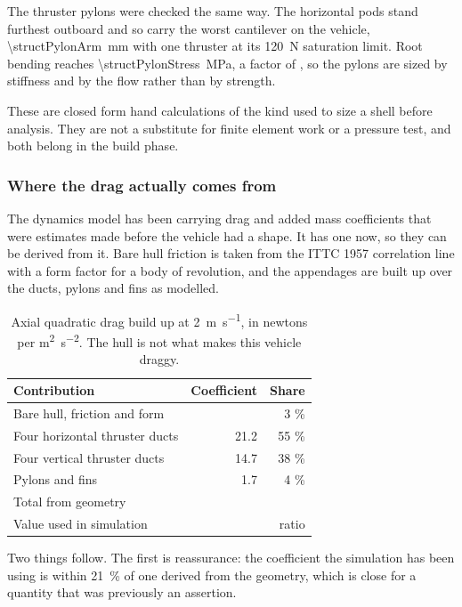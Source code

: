 \documentclass[10pt,a4paper]{article}
\begin{document}
The thruster pylons were checked the same way. The horizontal pods stand
furthest outboard and so carry the worst cantilever on the vehicle,
\SI{\structPylonArm}{\milli\metre} with one thruster at its
\SI{120}{\newton} saturation limit. Root bending reaches
\SI{\structPylonStress}{\mega\pascal}, a factor of \structPylonSf{}, so the
pylons are sized by stiffness and by the flow rather than by strength.

These are closed form hand calculations of the kind used to size a shell before
analysis. They are not a substitute for finite element work or a pressure test,
and both belong in the build phase.

\subsubsection{Where the drag actually comes from}\label{sec:drag}

The dynamics model has been carrying drag and added mass coefficients that were
estimates made before the vehicle had a shape. It has one now, so they can be
derived from it. Bare hull friction is taken from the ITTC 1957 correlation
line with a form factor for a body of revolution, and the appendages are built
up over the ducts, pylons and fins as modelled.

\begin{table}[htbp]\centering\small
\caption{Axial quadratic drag build up at \SI{2}{\metre\per\second}, in newtons
per \si{\metre\squared\per\second\squared}. The hull is not what makes this
vehicle draggy.}
\begin{tabular}{lrr}
\toprule
\textbf{Contribution} & \textbf{Coefficient} & \textbf{Share} \\
\midrule
Bare hull, friction and form & \hydroDragHull{} & 3 \% \\
Four horizontal thruster ducts & 21.2 & 55 \% \\
Four vertical thruster ducts & 14.7 & 38 \% \\
Pylons and fins & 1.7 & 4 \% \\
\midrule
Total from geometry & \hydroDragTotal{} & \\
Value used in simulation & \hydroDragSim{} & ratio \hydroDragRatio{} \\
\bottomrule
\end{tabular}
\end{table}

Two things follow. The first is reassurance: the coefficient the simulation has
been using is within \SI{21}{\percent} of one derived from the geometry, which
is close for a quantity that was previously an assertion.
\end{document}

